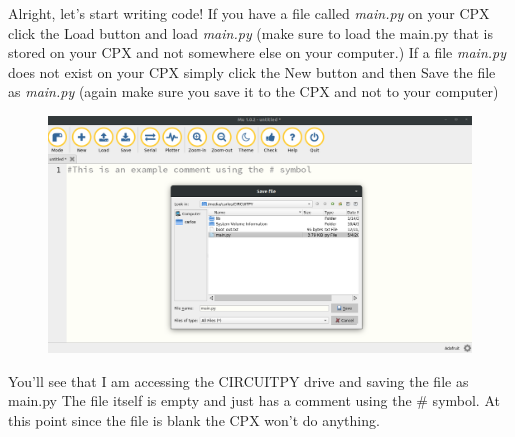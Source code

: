 Alright, let’s start writing code! If you have a file called {\it main.py}
on your CPX click the Load button and load {\it main.py} (make sure to load
the main.py that is stored on your CPX and not somewhere else on your
computer.) If a file {\it main.py} does not exist on your CPX simply click
the New button and then Save the file as {\it main.py} (again make sure you
save it to the CPX and not to your computer) 
\begin{figure}[H]
  \begin{center}
    \includegraphics[width=\textwidth]{Figures/Mu2.png}
  \end{center}
\end{figure}
You’ll see that I am accessing the CIRCUITPY drive and saving the file
as main.py The file itself is empty and just has a comment using the \#
symbol. At this point since the file is blank the CPX won’t do
anything.

